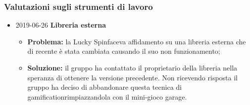 \subsubsection{Valutazioni sugli strumenti di lavoro}
\begin{itemize}
					
		\item 2019-06-26 \textbf{Libreria esterna} \\
		\begin{itemize}
			\item \textbf{Problema:} la Lucky Spin\glosp faceva affidamento su una libreria esterna che di recente è stata cambiata causando il suo non funzionamento;
			\item \textbf{Soluzione:} il gruppo ha contattato il proprietario della libreria nella speranza di ottenere la versione precedente. Non ricevendo risposta il gruppo ha deciso di abbandonare questa tecnica di gamification\glosp rimpiazzandola con il mini-gioco garage.
		\end{itemize}
\end{itemize}